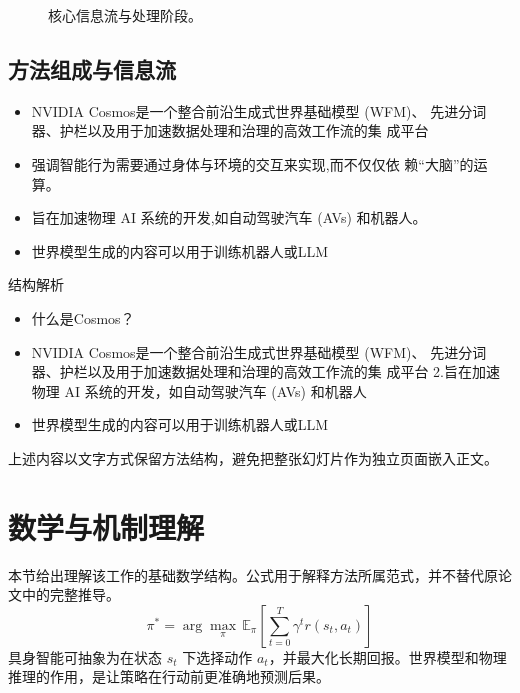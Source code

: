 \documentclass[UTF8,11pt,a4paper]{ctexart}
\begin{document}
\begin{figure}[H]
\centering
{}
\caption{核心信息流与处理阶段。}
\end{figure}

\subsection{方法组成与信息流}
\begin{itemize}
\item NVIDIA Cosmos是一个整合前沿生成式世界基础模型 (WFM)、 先进分词器、护栏以及用于加速数据处理和治理的高效工作流的集 成平台
\item 强调智能行为需要通过身体与环境的交互来实现,而不仅仅依 赖“大脑”的运算。
\item 旨在加速物理 AI 系统的开发,如自动驾驶汽车 (AVs) 和机器人。
\item 世界模型生成的内容可以用于训练机器人或LLM
\end{itemize}

\begin{keybox}{结构解析}
\begin{itemize}
\item 什么是Cosmos？
\item NVIDIA Cosmos是一个整合前沿生成式世界基础模型 (WFM)、 先进分词器、护栏以及用于加速数据处理和治理的高效工作流的集 成平台 2.旨在加速物理 AI 系统的开发，如自动驾驶汽车 (AVs) 和机器人
\item 世界模型生成的内容可以用于训练机器人或LLM
\end{itemize}
\end{keybox}

上述内容以文字方式保留方法结构，避免把整张幻灯片作为独立页面嵌入正文。

\section{数学与机制理解}
本节给出理解该工作的基础数学结构。公式用于解释方法所属范式，并不替代原论文中的完整推导。
\begin{equation}
\pi^*=\arg\max_\pi\,\mathbb{E}_\pi\!\left[\sum_{t=0}^{T}\gamma^t r(s_t,a_t)\right]
\end{equation}
具身智能可抽象为在状态 $s_t$ 下选择动作 $a_t$，并最大化长期回报。世界模型和物理推理的作用，是让策略在行动前更准确地预测后果。
\end{document}
